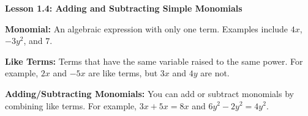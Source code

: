 \begin{center}
\textbf{Lesson 1.4: Adding and Subtracting Simple Monomials}
\end{center}

\vspace*{1ex}

    \textbf{Monomial:} An algebraic expression with only one term. Examples include \( 4x \), \( -3y^2 \), and \( 7 \).
    
    \textbf{Like Terms:} Terms that have the same variable raised to the same power. For example, \( 2x \) and \( -5x \) are like terms, but \( 3x \) and \( 4y \) are not.
  
    \textbf{Adding/Subtracting Monomials:} You can add or subtract monomials by combining like terms. For example, \( 3x + 5x = 8x \) and \( 6y^2 - 2y^2 = 4y^2 \).

 

 
